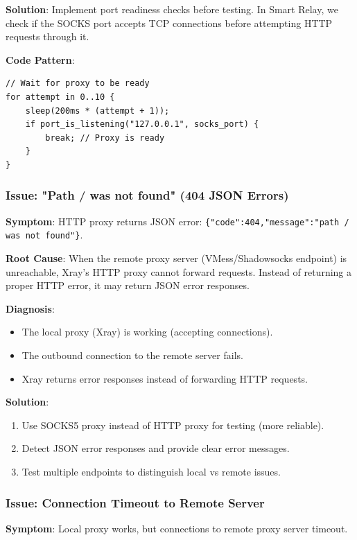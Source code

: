 \textbf{Solution}: Implement port readiness checks before testing. In Smart Relay, we check if the SOCKS port accepts TCP connections before attempting HTTP requests through it.

\textbf{Code Pattern}:
\begin{verbatim}
// Wait for proxy to be ready
for attempt in 0..10 {
    sleep(200ms * (attempt + 1));
    if port_is_listening("127.0.0.1", socks_port) {
        break; // Proxy is ready
    }
}
\end{verbatim}

\subsubsection{Issue: "Path / was not found" (404 JSON Errors)}

\textbf{Symptom}: HTTP proxy returns JSON error: \texttt{\{"code":404,"message":"path / was not found"\}}.

\textbf{Root Cause}: When the remote proxy server (VMess/Shadowsocks endpoint) is unreachable, Xray's HTTP proxy cannot forward requests. Instead of returning a proper HTTP error, it may return JSON error responses.

\textbf{Diagnosis}:
\begin{itemize}
    \item The local proxy (Xray) is working (accepting connections).
    \item The outbound connection to the remote server fails.
    \item Xray returns error responses instead of forwarding HTTP requests.
\end{itemize}

\textbf{Solution}: 
\begin{enumerate}
    \item Use SOCKS5 proxy instead of HTTP proxy for testing (more reliable).
    \item Detect JSON error responses and provide clear error messages.
    \item Test multiple endpoints to distinguish local vs remote issues.
\end{enumerate}

\subsubsection{Issue: Connection Timeout to Remote Server}

\textbf{Symptom}: Local proxy works, but connections to remote proxy server timeout.

